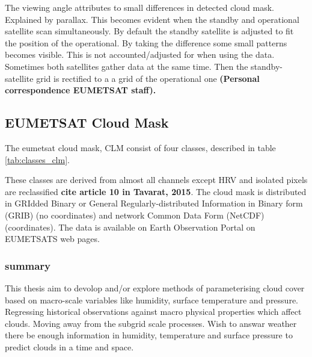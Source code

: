 The viewing angle attributes to small differences in detected cloud mask. Explained by parallax. This becomes evident when the standby and operational satellite scan simultaneously. By default the standby satellite is adjusted to fit the position of the operational. By taking the difference some small patterns becomes visible. This is not accounted/adjusted for when using the data. Sometimes both satellites gather data at the same time. Then the standby-satellite grid is rectified to a a grid of the operational one \textbf{(Personal correspondence EUMETSAT staff).} 

\subsection{EUMETSAT Cloud Mask} \label{sec:EUMETSAT_cloud_mask}

The \acrshort{eumetsat} cloud mask, CLM consist of four classes, described in table \ref{tab:classes_clm}.




These classes are derived from almost all channels except HRV and isolated pixels are reclassified \textbf{cite article 10 in Tavarat, 2015}. The cloud mask is distributed in GRIdded Binary or General Regularly-distributed Information in Binary form (GRIB) (no coordinates) and network Common Data Form (NetCDF) (coordinates). The data is available on Earth Observation Portal on EUMETSATS web pages. 




\subsubsection{summary}
This thesis aim to devolop and/or explore methods of parameterising cloud cover based on macro-scale variables like humidity, surface temperature and pressure. Regressing historical observations against macro physical properties which affect clouds. Moving away from the subgrid scale processes. Wish to answar weather there be enough information in humidity, temperature and surface pressure to predict clouds in a time and space.



